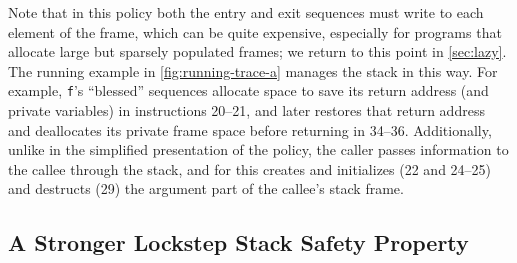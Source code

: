 \documentclass[acmsmall,review,anonymous]{acmart}\settopmatter{printfolios=true,printccs=false,printacmref=false}
\begin{document}
{Note that in this policy both the entry and exit sequences
must write to each element of
the frame, which can be quite expensive, especially for programs that
allocate large but sparsely populated frames; we return to this point
in \cref{sec:lazy}.
%
The running example in \cref{fig:running-trace-a} manages the stack in this way.
For example, {\tt f}'s ``blessed'' sequences allocate space to save its return
address (and private variables) in instructions 20--21, and later restores that
return address and deallocates its private frame space before returning in
34--36. Additionally, unlike in the simplified presentation of the policy, the
caller passes information to the callee through the stack, and for this creates
and initializes (22 and 24--25) and destructs (29) the argument part of the
callee's stack frame.
%



\subsection{A Stronger Lockstep Stack Safety Property}
\label{sec:lockstep}


}
\end{document}
